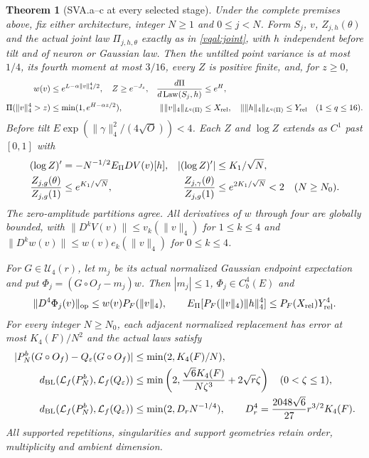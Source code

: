 \documentclass[11pt]{article}
\theoremstyle{plain}
\newtheorem{theorem}{Theorem}[section]
\theoremstyle{definition}
\theoremstyle{remark}
\DeclareMathOperator{\Law}{Law}
\begin{document}
\begin{theorem}[SVA.a--c at every selected stage]\label{sva:relative-theorem}
Under the complete premises above, fix either architecture, integer
$N\ge1$ and $0\le j<N$. Form $S_j$, $v$, $Z_{j,h}(\theta)$ and the
actual joint law $\Pi_{j,h,\theta}$ exactly as in \eqref{vqal:joint},
with $h$ independent before tilt and of neuron or Gaussian law. Then the
untilted point variance is at most $1/4$, its fourth moment at most
$3/16$, every $Z$ is positive finite, and, for $z\ge0$,
\begin{align}\label{sva:moments}
 w(v)&\le e^{L-\alpha\|v\|_4^4/2},\quad Z\ge e^{-J_z},
 &{d\Pi\over d\Law(S_j,h)}&\le e^H,\nonumber\\
 \Pi(\|v\|_4^4>z)&\le\min(1,e^{H-\alpha z/2}),
 &\|\|v\|_4\|_{L^q(\Pi)}&\le X_{\rm rel},\quad
 \|\|h\|_4\|_{L^q(\Pi)}\le Y_{\rm rel}\quad(1\le q\le16).
\end{align}
Before tilt $E\exp(\|\gamma\|_4^2/(4\sqrt O))<4$.
Each $Z$ and $\log Z$ extends as $C^1$ past $[0,1]$ with
\begin{align}\label{sva:partitionratios}
 (\log Z)'&=-N^{-1/2}E_\Pi DV(v)[h],
 &| (\log Z)'|&\le K_1/\sqrt N,\nonumber\\
 {Z_{j,g}(\theta)\over Z_{j,g}(1)}&\le e^{K_1/\sqrt N},
 &{Z_{j,\gamma}(\theta)\over Z_{j,g}(1)}&\le e^{2K_1/\sqrt N}<2
 \quad(N\ge N_0).
\end{align}
The zero-amplitude partitions agree. All derivatives of $w$ through
four are globally bounded, with $\|D^kV(v)\|\le v_k(\|v\|_4)$ for
$1\le k\le4$ and $\|D^kw(v)\|\le w(v)e_k(\|v\|_4)$ for $0\le k\le4$.

For $G\in\mathcal U_4(r)$, let $m_j$ be its actual normalized Gaussian
endpoint expectation and put $\Phi_j=(G\circ O_f-m_j)w$. Then
$|m_j|\le1$, $\Phi_j\in C_b^4(E)$ and
\begin{equation}\label{sva:derivative}
 \|D^4\Phi_j(v)\|_{\rm op}\le w(v)P_F(\|v\|_4),\qquad
 E_\Pi[P_F(\|v\|_4)\|h\|_4^4]\le P_F(X_{\rm rel})Y_{\rm rel}^4.
\end{equation}
For every integer $N\ge N_0$, each adjacent normalized replacement has
error at most $K_4(F)/N^2$ and the actual laws satisfy
\begin{align}\label{sva:BL}
 |P_N^b(G\circ O_f)-Q_\varepsilon(G\circ O_f)|
 &\le\min(2,K_4(F)/N),\nonumber\\
 d_{\rm BL}(\mathcal L_f(P_N^b),\mathcal L_f(Q_\varepsilon))
 &\le\min\left(2,{\sqrt6K_4(F)\over N\zeta^3}
                         +2\sqrt r\zeta\right)\quad(0<\zeta\le1),\nonumber\\
 d_{\rm BL}(\mathcal L_f(P_N^b),\mathcal L_f(Q_\varepsilon))
 &\le\min(2,D_rN^{-1/4}),\qquad
 D_r^4={2048\sqrt6\over27}r^{3/2}K_4(F).
\end{align}
All supported repetitions, singularities and support geometries retain
order, multiplicity and ambient dimension.
\end{theorem}
\end{document}
